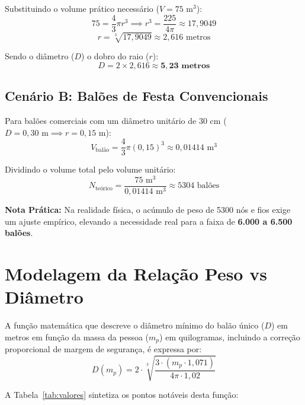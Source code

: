 \documentclass[11pt,a4paper]{article}
\begin{document}
	Substituindo o volume prático necessário ($V = 75\text{ m}^3$):
	\begin{equation}
		75 = \frac{4}{3}\pi r^3 \implies r^3 = \frac{225}{4\pi} \approx 17,9049
	\end{equation}
	\begin{equation}
		r = \sqrt[3]{17,9049} \approx 2,616\text{ metros}
	\end{equation}
	
	Sendo o diâmetro ($D$) o dobro do raio ($r$):
	\begin{equation}
		D = 2 \times 2,616 \approx \mathbf{5,23\text{ metros}}
	\end{equation}
	
	\subsection{Cenário B: Balões de Festa Convencionais}
	Para balões comerciais com um diâmetro unitário de $30\text{ cm}$ ($D = 0,30\text{ m} \implies r = 0,15\text{ m}$):
	\begin{equation}
		V_{\text{balão}} = \frac{4}{3}\pi (0,15)^3 \approx 0,01414\text{ m}^3
	\end{equation}
	
	Dividindo o volume total pelo volume unitário:
	\begin{equation}
		N_{\text{teórico}} = \frac{75\text{ m}^3}{0,01414\text{ m}^3} \approx 5304\text{ balões}
	\end{equation}
	
	\textbf{Nota Prática:} Na realidade física, o acúmulo de peso de 5300 nós e fios exige um ajuste empírico, elevando a necessidade real para a faixa de \textbf{6.000 a 6.500 balões}.
	
	\section{Modelagem da Relação Peso vs Diâmetro}
	A função matemática que descreve o diâmetro mínimo do balão único ($D$) em metros em função da massa da pessoa ($m_p$) em quilogramas, incluindo a correção proporcional de margem de segurança, é expressa por:
	\begin{equation}
		D(m_p) = 2 \cdot \sqrt[3]{\frac{3 \cdot (m_p \cdot 1,071)}{4\pi \cdot 1,02}}
	\end{equation}
	
	A Tabela~\ref{tab:valores} sintetiza os pontos notáveis desta função:
	
\end{document}
